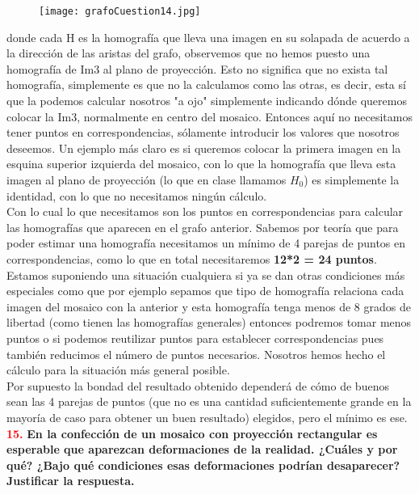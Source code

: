 \documentclass[10pt,a4paper]{article}
\begin{document}
\begin{figure}[H]
\centering
\texttt{[image: grafoCuestion14.jpg]}
\end{figure}

donde cada H es la homografía que lleva una imagen en su solapada de acuerdo a la dirección de las aristas del grafo, observemos que no hemos puesto una homografía de Im3 al plano de proyección. Esto no significa que no exista tal homografía, simplemente es que no la calculamos como las otras, es decir, esta sí que la podemos calcular nosotros "a ojo" simplemente indicando dónde queremos colocar la Im3, normalmente en centro del mosaico. Entonces aquí no necesitamos tener puntos en correspondencias, sólamente introducir los valores que nosotros deseemos. Un ejemplo más claro es si queremos colocar la primera imagen en la esquina superior izquierda del mosaico, con lo que la homografía que lleva esta imagen al plano de proyección (lo que en clase llamamos $H_{0}$) es simplemente la identidad, con lo que no necesitamos ningún cálculo.\\

Con lo cual lo que necesitamos son los puntos en correspondencias para calcular las homografías que aparecen en el grafo anterior. Sabemos por teoría que para poder estimar una homografía necesitamos un mínimo de 4 parejas de puntos en correspondencias, como lo que en total necesitaremos \textbf{12*2 = 24 puntos}.\\

Estamos suponiendo una situación cualquiera si ya se dan otras condiciones más especiales como que por ejemplo sepamos que tipo de homografía relaciona cada imagen del mosaico con la anterior y esta homografía tenga menos de 8 grados de libertad (como tienen las homografías generales) entonces podremos tomar menos puntos o si podemos reutilizar puntos para establecer correspondencias pues también reducimos el número de puntos necesarios. Nosotros hemos hecho el cálculo para la situación más general posible.\\

Por supuesto la bondad del resultado obtenido dependerá de cómo de buenos sean las 4 parejas de puntos (que no es una cantidad suficientemente grande en la mayoría de caso para obtener un buen resultado) elegidos, pero el mínimo es ese.\\

\textcolor{red}{\textbf{15.}} \textbf{En la confección de un mosaico con proyección rectangular es esperable que aparezcan deformaciones de la realidad. ¿Cuáles y por qué? ¿Bajo qué condiciones esas deformaciones podrían desaparecer? Justificar la respuesta.}\\
\end{document}
